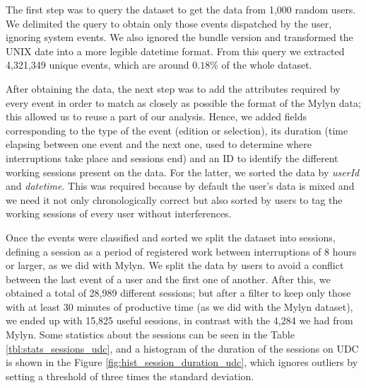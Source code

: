 \documentclass[times]{smrauth}
\begin{document}
The first step was to query the dataset to get the data from 1,000 random users. We delimited the query to obtain only those events dispatched by the user, ignoring system events. We also ignored the bundle version and transformed the UNIX date into a more legible datetime format. From this query we extracted 4,321,349 unique events, which are around $0.18\%$ of the whole dataset.

After obtaining the data, the next step was to add the attributes required by every event in order to match as closely as possible the format of the Mylyn data; this allowed us to reuse a part of our analysis. Hence, we added fields corresponding to the type of the event (edition or selection), its duration (time elapsing between one event and the next one, used to determine where interruptions take place and sessions end) and an ID to identify the different working sessions present on the data. For the latter, we sorted the data by \textit{userId} and \textit{datetime}. This was required because by default the user's data is mixed and we need it not only chronologically correct but also sorted by users to tag the working sessions of every user without interferences. 


Once the events were classified and sorted we split the dataset into sessions, defining a session as a period of registered work between interruptions of 8 hours or larger, as we did with Mylyn. We split the data by users to avoid a conflict between the last event of a user and the first one of another. After this, we obtained a total of 28,989 different sessions; but after a filter to keep only those with at least 30 minutes of productive time (as we did with the Mylyn dataset), we ended up with 15,825 useful sessions, in contrast with the 4,284 we had from Mylyn. Some statistics about the sessions can be seen in the Table \ref{tbl:stats_sessions_udc}, and a histogram of the duration of the sessions on UDC is shown in the Figure \ref{fig:hist_session_duration_udc}, which ignores outliers by setting a threshold of three times the standard deviation.
\end{document}

